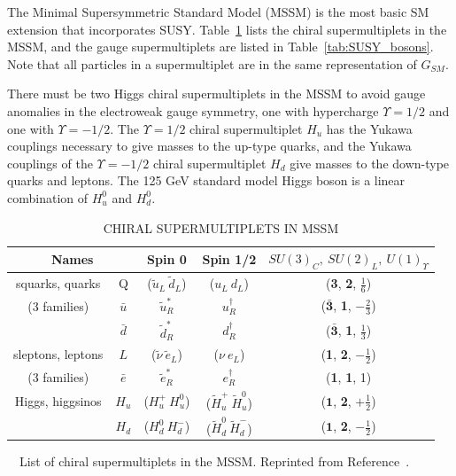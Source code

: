 The Minimal Supersymmetric Standard Model (MSSM) is the most basic SM extension that incorporates SUSY. Table~\ref{tab:SUSY_fermions} lists the chiral supermultiplets in the MSSM, and the gauge supermultiplets are listed in Table~\ref{tab:SUSY_bosons}. Note that all particles in a supermultiplet are in the same representation of $G_{SM}$. 

There must be two Higgs chiral supermultiplets in the MSSM to avoid gauge anomalies in the electroweak gauge symmetry, one with hypercharge $\Upsilon = 1/2$ and one with $\Upsilon = -1/2$. The $\Upsilon = 1/2$ chiral supermultiplet $H_u$ has the Yukawa couplings necessary to give masses to the up-type quarks, and the Yukawa couplings of the $\Upsilon = -1/2$ chiral supermultiplet $H_d$ give masses to the down-type quarks and leptons. The 125 GeV standard model Higgs boson is a linear combination of $H_u^0$ and $H_d^0$.


\begin{table}[ht]
    \caption{CHIRAL SUPERMULTIPLETS IN MSSM}
    \centering
    \begin{threeparttable}
    \begin{tabular}{|c|c|c|c|c|}
    \hline
    \hline
    \multicolumn{2}{|c|}{Names} & Spin 0 & Spin 1/2 &$SU(3)_C,~SU(2)_L,~U(1)_\Upsilon $\\
  	  \hline
           \hline    
squarks, quarks  & Q & ($\tilde{u}_L~\tilde{d}_L$) & ($u_L~d_L$)  & (\textbf{3}, \textbf{2}, $\frac{1}{6}$) \\
(3 families) & $\bar{u}$ & $\tilde{u}_R^\ast$ & $u_R^\dagger$ & ($\bar{\textbf{3}}$, \textbf{1}, $-\frac{2}{3}$) \\
                   & $\bar{d}$ & $\tilde{d}_R^*$     & $d_R^\dagger$ & ($\bar{\textbf{3}}$, \textbf{1}, $\frac{1}{3}$) \\
                   \hline
sleptons, leptons  & $L$ & ($\tilde{\nu}~\tilde{e}_L$) & ($\nu~e_L$)      &  (\textbf{1}, \textbf{2}, $-\frac{1}{2}$) \\
(3 families) & $\bar{e}$ & $\tilde{e}_R^\ast$  & $e_R^\dagger$ &  (\textbf{1}, \textbf{1}, 1) \\
\hline
Higgs, higgsinos & $H_u$  & ($H_u^+ ~ H_u^0$) & ($\tilde{H}_u^+ ~ \tilde{H}_u^0$) & ($\textbf{1}$, \textbf{2}, $+\frac{1}{2}$) \\
                           & $H_d$  & ($H_d^0 ~ H_d^-$) & ($\tilde{H}_d^0 ~ \tilde{H}_d^-$) & ($\textbf{1}$, \textbf{2}, $-\frac{1}{2}$) \\
           \hline
           \hline
    \end{tabular}
    \label{tab:SUSY_fermions}
    \begin{tablenotes}
\footnotesize
\item{~~List of chiral supermultiplets in the MSSM. Reprinted from Reference~\cite{SUSYprimer}.}
\end{tablenotes}
\end{threeparttable}
\end{table}

